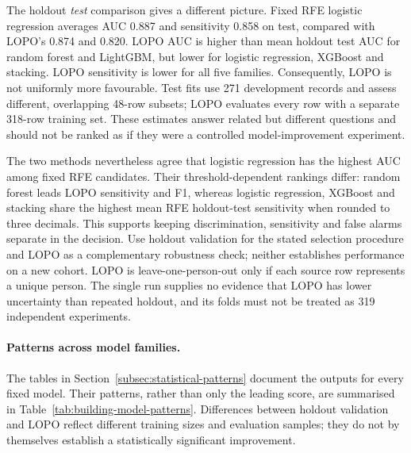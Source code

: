 The holdout \emph{test} comparison gives a different picture. Fixed RFE
logistic regression averages AUC 0.887 and sensitivity 0.858 on test,
compared with LOPO's 0.874 and 0.820. LOPO AUC is higher than mean holdout
test AUC for random forest and LightGBM, but lower for logistic regression,
XGBoost and stacking. LOPO sensitivity is lower for all five families.
Consequently, LOPO is not uniformly more favourable. Test fits use 271
development records and assess different, overlapping 48-row subsets;
LOPO evaluates every row with a separate 318-row training set. These
estimates answer related but different questions and should not be ranked
as if they were a controlled model-improvement experiment.

The two methods nevertheless agree that logistic regression has the highest
AUC among fixed RFE candidates. Their threshold-dependent rankings differ:
random forest leads LOPO sensitivity and F1, whereas logistic regression,
XGBoost and stacking share the highest mean RFE holdout-test sensitivity
when rounded to three decimals. This supports keeping discrimination,
sensitivity and false alarms separate in the decision. Use holdout validation
for the stated selection procedure and LOPO as a complementary robustness
check; neither establishes performance on a new cohort. LOPO is
leave-one-person-out only if each source row represents a unique person.
The single run supplies no evidence that LOPO has lower uncertainty than
repeated holdout, and its folds must not be treated as 319 independent
experiments.

\paragraph{Patterns across model families.}
\label{subsec:building-model-patterns}

The tables in Section~\ref{subsec:statistical-patterns} document the outputs for every fixed model. Their
patterns, rather than only the leading score, are summarised in
Table~\ref{tab:building-model-patterns}. Differences between holdout validation
and LOPO reflect different training sizes and evaluation samples; they do not
by themselves establish a statistically significant improvement.

